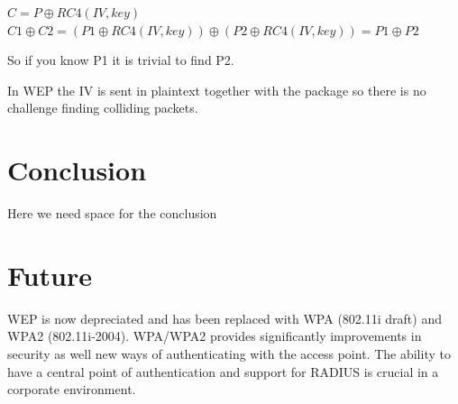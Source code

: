 \documentclass[twocolumn,11pt]{IEEEtran}
\begin{document}
$C = P \oplus RC4(IV,key)$ \\
$C1 \oplus C2 = (P1 \oplus RC4(IV,key) ) \oplus ( P2 \oplus RC4(IV,key)) = P1 \oplus P2 $

So if you know P1 it is trivial to find P2. 

In WEP the IV is sent in plaintext together with the package so there is no challenge finding colliding packets. 

\section {Conclusion}
\label{sec:conclusion}

Here we need space for the conclusion



\section {Future}
\label{sec:future}

WEP is now depreciated and has been replaced with WPA (802.11i draft) and WPA2 (802.11i-2004). WPA/WPA2 provides significantly improvements in security as well new ways of authenticating with the access point. The ability to have a central point  of authentication and support for RADIUS is crucial in a corporate environment.






\end{document}
